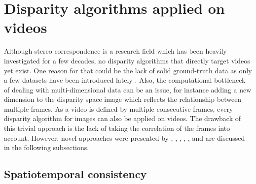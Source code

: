 \section{Disparity algorithms applied on videos}

Although stereo correspondence is a research field which has been heavily investigated for a few decades, no disparity algorithms that directly target videos yet exist.
One reason for that could be the lack of solid ground-truth data as only a few datasets have been introduced lately \citep{Butler:ECCV:2012, scharstein2014high}.
Also, the computational bottleneck of dealing with multi-dimensional data can be an issue, for instance adding a new dimension to the disparity space image which reflects the relationship between multiple frames.
As a video is defined by multiple consecutive frames, every disparity algorithm for images can also be applied on videos.
The drawback of this trivial approach is the lack of taking the correlation of the frames into account.
However, novel approaches were presented by \citeauthor{khoshabeh2011spatio} \citep{khoshabeh2011spatio}, \citeauthor{lee2012local} \citep{lee2012local}, \citeauthor{davis2003spacetime} \citep{davis2003spacetime}, \citeauthor{richardt2010real} \citep{richardt2010real}, \citeauthor{hosni2012temporally} \citep{hosni2012temporally}, and are discussed in the following subsections.

\subsection{Spatiotemporal consistency}

